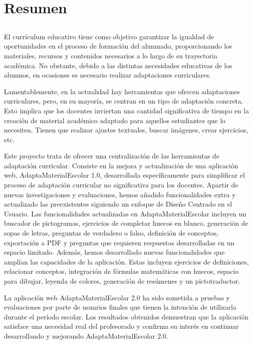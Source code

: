 \chapter*{Resumen}

\section*{\tituloPortadaVal}

El currículum educativo tiene como objetivo garantizar la igualdad de oportunidades en el proceso de formación del alumnado, proporcionando los materiales, recursos y contenidos necesarios a lo largo de su trayectoria académica. No obstante, debido a las distintas necesidades educativas de los alumnos, en ocasiones es necesario realizar adaptaciones curriculares.

Lamentablemente, en la actualidad hay herramientas que ofrecen adaptaciones curriculares, pero, en su mayoría, se centran en un tipo de adaptación concreta. Esto implica que los docentes inviertan una cantidad significativa de tiempo en la creación de material académico adaptado para aquellos estudiantes que lo necesiten. Tienen que realizar ajustes textuales, buscar imágenes, crear ejercicios, etc.

Este proyecto trata de ofrecer una centralización de las herramientas de adaptación curricular. Consiste en la mejora y actualización de una aplicación web, AdaptaMaterialEscolar 1.0, desarrollada específicamente para simplificar el proceso de adaptación curricular no significativa para los docentes. Apartir de nuevas investigaciones y evaluaciones, hemos añadido funcionalidades extra y actualizado las preexistentes siguiendo un enfoque de Diseño Centrado en el Usuario. Las funcionalidades actualizadas en AdaptaMaterialEscolar incluyen un buscador de pictogramas, ejercicios de completar huecos en blanco, generación de sopas de letras, preguntas de verdadero o falso, definición de conceptos, exportación a PDF y preguntas que requieren respuestas desarrolladas en un espacio limitado. Además, hemos desarrollado nuevas funcionalidades que amplían las capacidades de la aplicación. Estas incluyen ejercicios de definiciones, relacionar conceptos, integración de fórmulas matemáticas con huecos, espacio para dibujar, leyenda de colores, generación de resúmenes y un pictotraductor.

La aplicación web AdaptaMaterialEscolar 2.0 ha sido sometida a pruebas y evaluaciones por parte de usuarios finales que tienen la intención de utilizarla durante el período escolar. Los resultados obtenidos demuestran que la aplicación satisface una necesidad real del profesorado y confirma su interés en continuar desarrollando y mejorando AdaptaMaterialEscolar 2.0.


